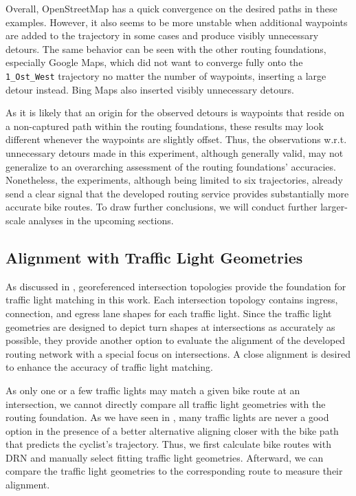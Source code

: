 Overall, OpenStreetMap has a quick convergence on the desired paths in these examples. However, it also seems to be more unstable when additional waypoints are added to the trajectory in some cases and produce visibly unnecessary detours. The same behavior can be seen with the other routing foundations, especially Google Maps, which did not want to converge fully onto the \texttt{1\_Ost\_West} trajectory no matter the number of waypoints, inserting a large detour instead. Bing Maps also inserted visibly unnecessary detours. 

As it is likely that an origin for the observed detours is waypoints that reside on a non-captured path within the routing foundations, these results may look different whenever the waypoints are slightly offset. Thus, the observations w.r.t. unnecessary detours made in this experiment, although generally valid, may not generalize to an overarching assessment of the routing foundations' accuracies. Nonetheless, the experiments, although being limited to six trajectories, already send a clear signal that the developed routing service provides substantially more accurate bike routes. To draw further conclusions, we will conduct further larger-scale analyses in the upcoming sections.

\subsection{Alignment with Traffic Light Geometries}

As discussed in , georeferenced intersection topologies provide the foundation for traffic light matching in this work. Each intersection topology contains ingress, connection, and egress lane shapes for each traffic light. Since the traffic light geometries are designed to depict turn shapes at intersections as accurately as possible, they provide another option to evaluate the alignment of the developed routing network with a special focus on intersections. A close alignment is desired to enhance the accuracy of traffic light matching.

As only one or a few traffic lights may match a given bike route at an intersection, we cannot directly compare all traffic light geometries with the routing foundation. As we have seen in , many traffic lights are never a good option in the presence of a better alternative aligning closer with the bike path that predicts the cyclist's trajectory. Thus, we first calculate bike routes with DRN and manually select fitting traffic light geometries. Afterward, we can compare the traffic light geometries to the corresponding route to measure their alignment. 

